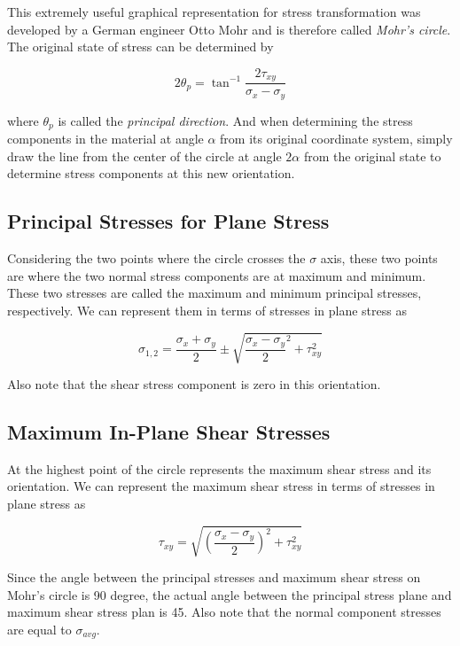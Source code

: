 \documentclass[
10pt,
a4paper,
openany,
svgnames,
]{book} %
\begin{document}
This extremely useful graphical representation for stress transformation was developed by a German engineer Otto Mohr and is therefore called \emph{Mohr’s circle}.
The original state of stress can be determined by

\begin{equation} \label{eqn: principal direction}
  2\theta_p = \tan^{-1}\frac{2\tau_{xy}}{\sigma_x - \sigma_y}
\end{equation}

where $\theta _p$ is called the \emph{principal direction}. And when determining the stress components in the material at angle $\alpha$ from its original coordinate system, simply draw the line from the center of the circle at angle $2\alpha$ from the original state to determine stress components at this new orientation.

\subsection{Principal Stresses for Plane Stress}

Considering the two points where the circle crosses the $\sigma$ axis, these two points are where the two normal stress components are at maximum and minimum. These two stresses are called the maximum and minimum principal stresses, respectively. We can represent them in terms of stresses in plane stress as

\begin{equation} \label{eqn: principal stresses}
  \sigma_{1,2} = \frac{\sigma_x + \sigma_y}{2} \pm \sqrt {\frac{\sigma_x - \sigma_y}{2}^2 + \tau _{xy}^2}
\end{equation}

Also note that the shear stress component is zero in this orientation.

\subsection{Maximum In-Plane Shear Stresses}

At the highest point of the circle represents the maximum shear stress and its orientation. We can represent the maximum shear stress in terms of stresses in plane stress as

\begin{equation} \label{eqn: max shear stress}
  \tau_{xy} = \sqrt {\left( \frac{\sigma_x - \sigma_y}{2} \right)^2 + \tau_{xy}^2}
\end{equation}

Since the angle between the principal stresses and maximum shear stress on Mohr’s circle is 90 degree, the actual angle between the principal stress plane and maximum shear stress plan is 45. Also note that the normal component stresses are equal to $\sigma_{avg}$.
\end{document}
